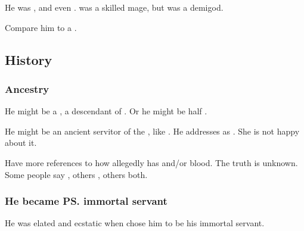 He was , and even . 
\Criseis was a skilled mage, but \Psyrex was a demigod.

Compare him to a . 









\subsection{History}
\subsubsection{Ancestry}
He might be a \rachyth, a descendant of \Secherdamon. Or he might be half \daemon. 

He might be an ancient servitor of the \dragons{}, like . 
He addresses \Criseis{} as . She is not happy about it. 

Have more references to how \Psyrex{} allegedly has \draconian{} and/or \daemonic{} blood. The truth is unknown. Some people say \draconian, others \daemonic, others both. 





\subsubsection{He became \ps{\Secherdamon} immortal servant}
He was elated and ecstatic when \Secherdamon{} chose him to be his immortal servant. 

